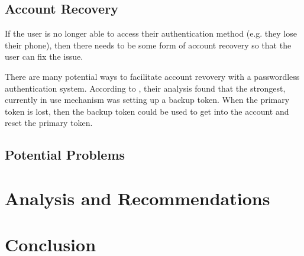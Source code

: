 \documentclass[12pt, letterpaper]{article}
\begin{document}
\subsection{Account Recovery}
If the user is no longer able to access their authentication method (e.g. they lose their phone), then there needs to be some form of account recovery so that the user can fix the issue.

There are many potential ways to facilitate account revovery with a passwordless authentication system.
According to \parencite{kunke2021evaluation}, their analysis found that the strongest, currently in use mechanism was setting up a backup token.
When the primary token is lost, then the backup token could be used to get into the account and reset the primary token.

\subsection{Potential Problems}

\newpage
\section{Analysis and Recommendations}

\newpage
\section{Conclusion}

\printbibliography
\end{document}
